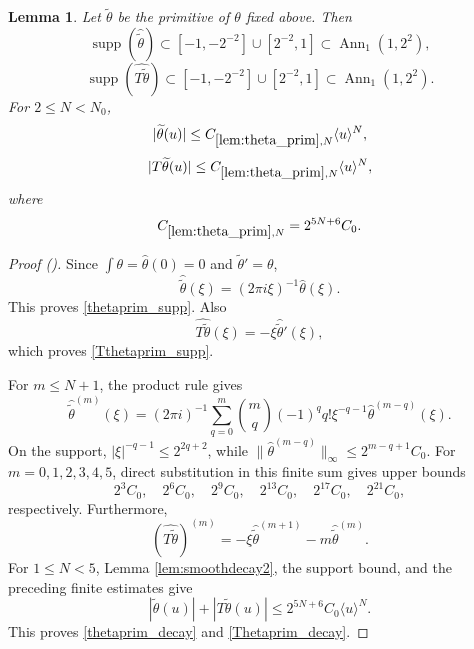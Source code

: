 \documentclass[12pt,reqno]{amsart}
\newcommand{\auto}{{({\tiny\faCar})}}
\theoremstyle{plain}
\newtheorem{lemma}[theorem]{Lemma}
\numberwithin{equation}{section}
\theoremstyle{remark}
\newcommand{\using}[1]{}
\begin{document}
\begin{lemma}\label{lem:theta_prim}\using{lem:smoothdecay2}
Let $\widetilde\theta$ be the primitive of $\theta$ fixed above. Then
\begin{equation}\label{thetaprim_supp}
\operatorname{supp}(\widehat{\widetilde\theta})
\subset[-1,-2^{-2}]\cup[2^{-2},1]
\subset\operatorname{Ann}_1(1,2^2),
\end{equation}
\begin{equation}\label{Tthetaprim_supp}
\operatorname{supp}(\widehat{T\widetilde\theta})
\subset[-1,-2^{-2}]\cup[2^{-2},1]
\subset\operatorname{Ann}_1(1,2^2).
\end{equation}
For $2\le N<N_0$,
\begin{equation}\label{thetaprim_decay}
|\widetilde\theta(u)|
\le C_{\ref{lem:theta_prim},N}\langle u\rangle^N,
\end{equation}
\begin{equation}\label{Thetaprim_decay}
|T\widetilde\theta(u)|
\le C_{\ref{lem:theta_prim},N}\langle u\rangle^N,
\end{equation}
where
\begin{equation}\label{auto:theta-primitive-constant-definition}
C_{\ref{lem:theta_prim},N}
=2^{5N+6}C_0.
\end{equation}
\end{lemma}
\begin{proof}[Proof \auto]
Since $\int\theta=\widehat\theta(0)=0$ and $\widetilde\theta'=\theta$,
\[
\widehat{\widetilde\theta}(\xi)=(2\pi i\xi)^{-1}\widehat\theta(\xi).
\]
This proves \eqref{thetaprim_supp}. Also
\[
\widehat{T\widetilde\theta}(\xi)
=-\xi\widehat{\widetilde\theta}'(\xi),
\]
which proves \eqref{Tthetaprim_supp}.

For $m\le N+1$, the product rule gives
\[
\widehat{\widetilde\theta}^{(m)}(\xi)
=(2\pi i)^{-1}
\sum_{q=0}^m\binom{m}{q}(-1)^q q!\xi^{-q-1}
\widehat\theta^{(m-q)}(\xi).
\]
On the support, $|\xi|^{-q-1}\le2^{2q+2}$, while
$\|\widehat\theta^{(m-q)}\|_\infty\le2^{m-q+1}C_0$. For $m=0,1,2,3,4,5$, direct substitution in this finite sum gives upper bounds
\[
2^3C_0,\quad2^6C_0,\quad2^9C_0,\quad2^{13}C_0,\quad2^{17}C_0,\quad2^{21}C_0,
\]
respectively. Furthermore,
\[
(\widehat{T\widetilde\theta})^{(m)}
=-\xi\widehat{\widetilde\theta}^{(m+1)}
-m\widehat{\widetilde\theta}^{(m)}.
\]
For $1\le N<5$, Lemma \ref{lem:smoothdecay2}, the support bound, and the preceding finite estimates give
\[
|\widetilde\theta(u)|+|T\widetilde\theta(u)|
\le2^{5N+6}C_0\langle u\rangle^N.
\]
This proves \eqref{thetaprim_decay} and \eqref{Thetaprim_decay}.
\end{proof}
\end{document}
